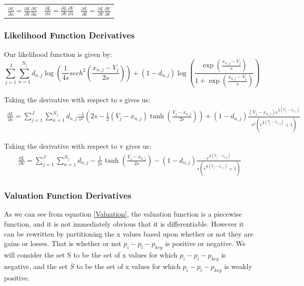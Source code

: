 \documentclass[12pt, letterpaper]{paper}
\begin{document}
\begin{center}
\begin{tabular}{lll}
$\frac{\partial L}{\partial \alpha} = \frac{ \partial L }{ \partial V} \frac{\partial V}{\partial \alpha}$ & $\frac{\partial L}{\partial \lambda} = \frac{ \partial L }{ \partial V} \frac{\partial V}{\partial \lambda}$ & $\frac{\partial L}{\partial \delta} = \frac{ \partial L }{ \partial V} \frac{\partial V}{\partial \delta}$\\
\end{tabular}
\end{center}

\subsubsection{Likelihood Function Derivatives}
\label{sec-4-3-1}

Our likelihood function is given by:
$$\sum_{j=1}^J \sum_{n=1}^{N_j} d_{n,j} \log( \frac{1}{4s} sech^2 ( \frac{x_{n,j} - V_j}{2s} ) ) + (1-d_{n,j}) \log ( \frac{\exp(\frac{x_{n,j} - V_j}{s})}{1+\exp(\frac{x_{n,j} - V_j}{s})} )$$

Taking the derivative with respect to s gives us:
\begin{align*}
\frac{ \partial L}{\partial s} = \sum_{j=1}^J \sum_{n=1}^{N_j} d_{n,j}  \frac{-1}{s^{2}} \left(2 s - \frac{1}{2} \left(V_j - x_{n,j} \right) \tanh{\left (\frac{V_j - x_{n,j} }{2 s} \right )}\right) 
 + (1-d_{n,j}) \frac{\left(V_j - x_{n,j} \right) e^{\frac{1}{s} \left(V_j - x_{n,j} \right)}}{s^{2} \left(e^{\frac{1}{s} \left(V_j - x_{n,j} \right)} + 1\right)}
\end{align*}

Taking the derivative with respect to v gives us:
\begin{align*}
\frac{\partial L}{\partial V} = \sum_{j=1}^J \sum_{n=1}^{N_j} d_{n,j} - \frac{1}{2 s} \tanh{\left (\frac{V_j - x_{n,j} }{2 s} \right )} - (1-d_{n,j}) \frac{e^{\frac{1}{s} \left(V_j - x_{n,j} \right)}}{s \left(e^{\frac{1}{s} \left(V_j - x_{n,j} \right)} + 1\right)}
\end{align*}

\subsubsection{Valuation Function Derivatives}
\label{sec-4-3-2}

As we can see from equation \ref{Valuation}, the valuation function is a
piecewise function, and it is not immediately obvious that it is
differentiable. However it can be rewritten by partitioning the x
values based upon whether or not they are gains or losses. That is
whether or not $p_i - p_l - p_{key}$ is positive or negative. We will
consider the set S to be the set of x values for which $p_i - p_l -
p_{key}$ is negative, and the set $\bar{S}$ to be the set of x values for
which $p_i - p_l - p_{key}$ is weakly positive.
\end{document}
